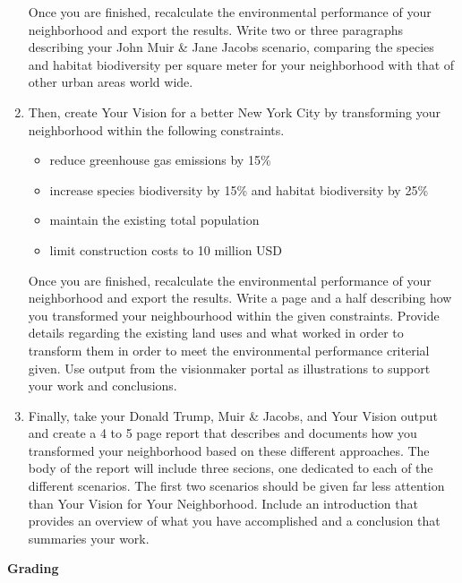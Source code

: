 \documentclass{article}
\begin{document}
\begin{enumerate}[leftmargin=15mm]
Once you are finished, recalculate the environmental performance of your neighborhood and export the results.  Write two or three paragraphs describing your John Muir \& Jane Jacobs scenario, comparing the species and habitat biodiversity per square meter for your neighborhood with that of other urban areas world wide.

\item Then, create Your Vision for a better New York City by transforming your neighborhood within the following constraints.

\begin{itemize}

\item reduce greenhouse gas emissions by 15\%

\item increase species biodiversity by 15\% and habitat biodiversity by 25\%

\item maintain the existing total population

\item limit construction costs to 10 million USD

\end{itemize}

Once you are finished, recalculate the environmental performance of your neighborhood and export the results.  Write a page and a half describing how you transformed your neighbourhood within the given constraints.  Provide details regarding the existing land uses and what worked in order to transform them in order to meet the environmental performance criterial given.  Use output from the visionmaker portal as illustrations to support your work and conclusions.

\item Finally, take your Donald Trump,  Muir \& Jacobs, and Your Vision output and create a 4 to 5 page report that describes and documents how you transformed your neighborhood based on these different approaches.  The body of the report will include three secions, one dedicated to each of the different scenarios.  The first two scenarios should be given far less attention than Your Vision for Your Neighborhood.  Include an introduction that provides an overview of what you have accomplished and a conclusion that summaries your work.

\end{enumerate}

\textbf{Grading}

\vspace{4mm}
\end{document}
